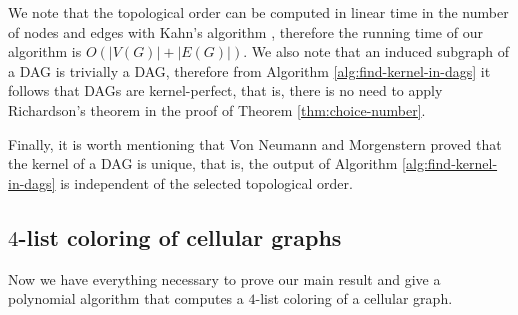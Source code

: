 \documentclass[a4paper, 12pt]{article}
\begin{document}
We note that the topological order can be computed in linear time in the number of nodes and edges with Kahn's algorithm \cite{Kahn:1962:TSL:368996.369025}, therefore the running time of our algorithm is $O(|V(G)|+|E(G)|)$. We also note that an induced subgraph of a DAG is trivially a DAG, therefore from Algorithm \ref{alg:find-kernel-in-dags} it follows that DAGs are kernel-perfect, that is, there is no need to apply Richardson's theorem in the proof of Theorem \ref{thm:choice-number}. 

Finally, it is worth mentioning that Von Neumann and Morgenstern \cite{neumann} proved that the kernel of a DAG is unique, that is, the output of Algorithm \ref{alg:find-kernel-in-dags} is independent of the selected topological order.
\subsection{$4$-list coloring of cellular graphs}\label{sec:4-list-coloring}
Now we have everything necessary to prove our main result and give a polynomial algorithm that computes a $4$-list coloring of a cellular graph. 
\end{document}
